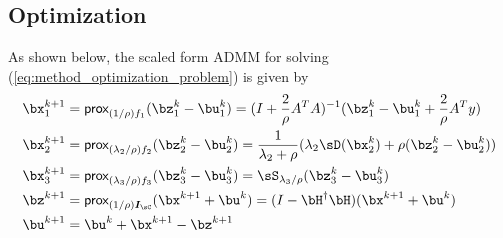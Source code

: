 \documentclass[../writeup.tex]{subfiles}
\begin{document}
\subsection{Optimization}

As shown below, the scaled form ADMM for solving (\ref{eq:method_optimization_problem}) is given by 
\begin{align*}
    \bx_1^{k+1}
        &= \prox_{(1/\rho)f_1}(\bz_1^k - \bu_1^k) 
        = (I + \frac{2}{\rho} A^TA)^{-1} ( \bz_1^k - \bu_1^k + \frac{2}{\rho}A^T y) \\
    \bx_2^{k+1}
        &= \prox_{(\lambda_2/\rho)f_2}(\bz_2^k - \bu_2^k) 
        = \frac{1}{\lambda_2+\rho} (\lambda_2 \sD(\bx_2^k) + \rho(\bz_2^k - \bu_2^k)) \\
    \bx_3^{k+1}
        &= \prox_{(\lambda_3/\rho)f_3} (\bz_3^k - \bu_3^k) 
        = \sS_{\lambda_3/\rho}(\bz_3^k - \bu_3^k) \\
    \bz^{k+1}
        &= \prox_{(1/\rho)\sI_{\sC}}(\bx^{k+1} + \bu^k)
        = (I - \bH^{\dagger}\bH)(\bx^{k+1}+\bu^k) \\
    \bu^{k+1}
        &= \bu^{k} + \bx^{k+1} - \bz^{k+1}
\end{align*}
\end{document}
